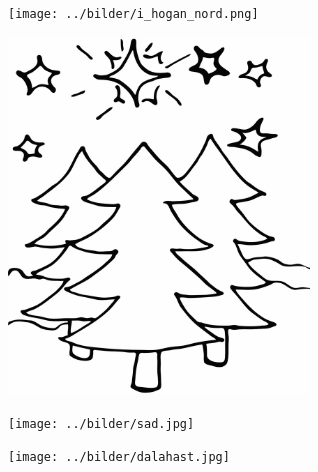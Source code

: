 %

\begin{figure}[!b]
\begin{center}
\texttt{[image: ../bilder/i\_hogan\_nord.png]} 
\end{center}
\end{figure}
\begin{figure}[!b]
	\begin{center}
		\includegraphics[width=8cm]{../bilder/fardigabilder/BilderTillKapitel/julstjarna.png} 
	\end{center}
\end{figure}
\clearpage

\clearpage

\clearpage

\clearpage

\clearpage

\begin{figure}[!b]
\begin{center}
\texttt{[image: ../bilder/sad.jpg]} 
\end{center}
\end{figure}
\clearpage

\clearpage

\clearpage

\clearpage

\clearpage

\clearpage

\clearpage

\clearpage

\clearpage

\begin{figure}[!b]
\begin{center}
\texttt{[image: ../bilder/dalahast.jpg]} 
\end{center}
\end{figure}
\clearpage

\clearpage

\clearpage

